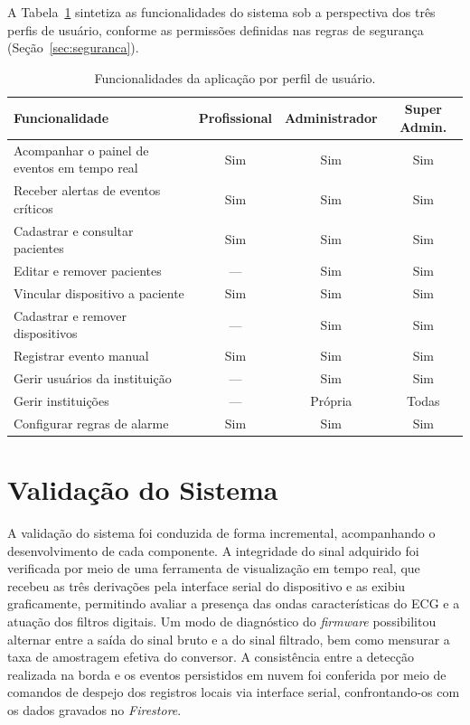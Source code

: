 A Tabela~\ref{tab:casosUso} sintetiza as funcionalidades do sistema sob a perspectiva dos três perfis de usuário, conforme as permissões definidas nas regras de segurança (Seção~\ref{sec:seguranca}).

\begin{table}[h]
    \centering
    \caption{Funcionalidades da aplicação por perfil de usuário.}
    \small
    \begin{tabular}{>{\arraybackslash}m{6.6cm}|c|c|c}
        \textbf{Funcionalidade} & \textbf{Profissional} & \textbf{Administrador} & \textbf{Super Admin.} \\ \hline
        Acompanhar o painel de eventos em tempo real & Sim & Sim & Sim \\ \hline
        Receber alertas de eventos críticos & Sim & Sim & Sim \\ \hline
        Cadastrar e consultar pacientes & Sim & Sim & Sim \\ \hline
        Editar e remover pacientes & --- & Sim & Sim \\ \hline
        Vincular dispositivo a paciente & Sim & Sim & Sim \\ \hline
        Cadastrar e remover dispositivos & --- & Sim & Sim \\ \hline
        Registrar evento manual & Sim & Sim & Sim \\ \hline
        Gerir usuários da instituição & --- & Sim & Sim \\ \hline
        Gerir instituições & --- & Própria & Todas \\ \hline
        Configurar regras de alarme & Sim & Sim & Sim \\ \hline
    \end{tabular}
    \label{tab:casosUso}
\end{table}


\section{Validação do Sistema}
\label{sec:validacao}

A validação do sistema foi conduzida de forma incremental, acompanhando o desenvolvimento de cada componente. A integridade do sinal adquirido foi verificada por meio de uma ferramenta de visualização em tempo real, que recebeu as três derivações pela interface serial do dispositivo e as exibiu graficamente, permitindo avaliar a presença das ondas características do \acs{ECG} e a atuação dos filtros digitais. Um modo de diagnóstico do \textit{firmware} possibilitou alternar entre a saída do sinal bruto e a do sinal filtrado, bem como mensurar a taxa de amostragem efetiva do conversor. A consistência entre a detecção realizada na borda e os eventos persistidos em nuvem foi conferida por meio de comandos de despejo dos registros locais via interface serial, confrontando-os com os dados gravados no \textit{Firestore}.


